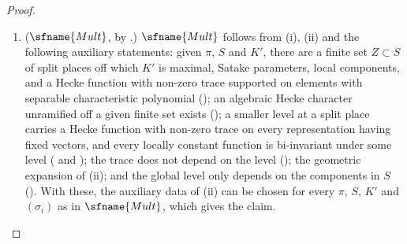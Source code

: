 \begin{proof}
\begin{enumerate}[label=(\roman*)]
explicit geometric expression, with $\dim W_\lambda\ne0$ (); a stabilisation
statement providing $c_0>0$, depending only on $(E,n,\lambda)$, which controls the geometric expression in terms of $\pi$
and finitely many other automorphic data of $\GL_n$ (); the statements of
the trace formula comparison used as the hypotheses $\sfname{G2s}$, $\sfname{MatchUnit}$, $\sfname{MatchSplit}$ and
$\sfname{EndoBlockS}$ of  (,
 and ,
); and the fact that a regular
automorphic datum of $\GL_n$ not containing $\pi$, with Satake parameters stable under inversion at almost all non-split
places, cannot have the Satake parameters of $\pi$ at almost all split places
().
\item ($\sfname{Mult}$, by .) $\sfname{Mult}$ follows from (i), (ii) and the following
auxiliary statements: given $\pi$, $S$ and $K'$, there are a finite set $Z\subset S$ of split places off which $K'$ is
maximal, Satake parameters, local components, and a Hecke function with non-zero trace supported on elements with separable
characteristic polynomial (); an algebraic Hecke character unramified off a given
finite set exists (); a smaller level at a split place carries a
Hecke function with non-zero trace on every representation having fixed vectors, and every locally constant function is
bi-invariant under some level ( and ); the trace does not
depend on the level (); the geometric expansion of (ii); and the global level only
depends on the components in $S$ (). With these, the auxiliary data of (ii) can be
chosen for every $\pi$, $S$, $K'$ and $(\sigma_i)$ as in $\sfname{Mult}$, which gives the claim.\qedhere
\end{enumerate}
\end{proof}

